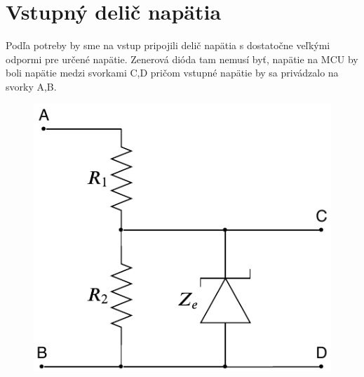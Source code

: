 \documentclass{article}
\begin{document}
\section{Vstupný delič napätia}
Podľa potreby by sme na vstup pripojili delič napätia s dostatočne veľkými odpormi pre určené napätie. Zenerová dióda tam nemusí byť, napätie na MCU by boli napätie medzi svorkami C,D pričom vstupné napätie by sa privádzalo na svorky A,B.

\begin{figure}[!h]
	\centering
	\includegraphics[width=0.4\linewidth]{../Obrazky/inputdivider.pdf}
\end{figure}
	
	
\end{document}
